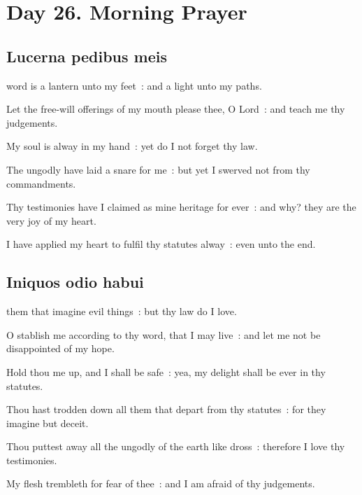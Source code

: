 \vspace{-0.5\baselineskip}

\section*{Day 26. Morning Prayer}

\vspace{-0.25\baselineskip}

\subsection{Lucerna pedibus meis}

\vspace{-0.10\baselineskip}

 word is a lantern unto my feet~: and a light unto my paths.\par
{}
Let the free-will offerings of my mouth please thee, O Lord~: and teach me thy judgements.\par
{}My soul is alway in my hand~: yet do I not forget thy law.\par
{}The ungodly have laid a snare for me~: but yet I swerved not from thy commandments.\par
{}Thy testimonies have I claimed as mine heritage for ever~: and why? they are the very joy of my heart.\par
{}I have applied my heart to fulfil thy statutes alway~: even unto the end.\par

\subsection{Iniquos odio habui}
 them that imagine evil things~: but thy law do I love.\par
{}
O stablish me according to thy word, that I may live~: and let me not be disappointed of my hope.\par
{}Hold thou me up, and I shall be safe~: yea, my delight shall be ever in thy statutes.\par
{}Thou hast trodden down all them that depart from thy statutes~: for they imagine but deceit.\par
{}Thou puttest away all the ungodly of the earth like dross~: therefore I love thy testimonies.\par
{}My flesh trembleth for fear of thee~: and I am afraid of thy judgements.\par

